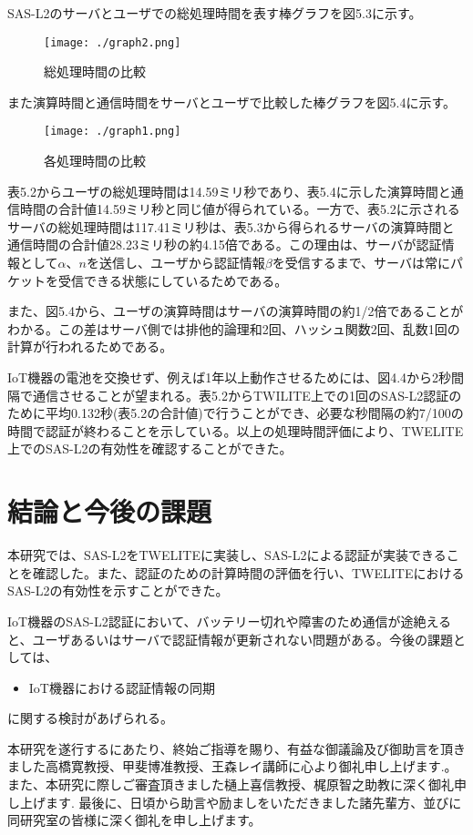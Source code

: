 \documentclass{thesis}
\begin{document}
SAS-L2のサーバとユーザでの総処理時間を表す棒グラフを図5.3に示す。

\begin{figure}[H]
 \center
 \texttt{[image: ./graph2.png]}
 \caption{総処理時間の比較}
\end{figure}

また演算時間と通信時間をサーバとユーザで比較した棒グラフを図5.4に示す。

\begin{figure}[H]
 \center
 \texttt{[image: ./graph1.png]}
 \caption{各処理時間の比較}
\end{figure}

表5.2からユーザの総処理時間は14.59ミリ秒であり、表5.4に示した演算時間と通信時間の合計値14.59ミリ秒と同じ値が得られている。一方で、表5.2に示されるサーバの総処理時間は117.41ミリ秒は、表5.3から得られるサーバの演算時間と通信時間の合計値28.23ミリ秒の約4.15倍である。この理由は、サーバが認証情報として$\alpha、n$を送信し、ユーザから認証情報$\beta$を受信するまで、サーバは常にパケットを受信できる状態にしているためである。

また、図5.4から、ユーザの演算時間はサーバの演算時間の約1/2倍であることがわかる。この差はサーバ側では排他的論理和2回、ハッシュ関数2回、乱数1回の計算が行われるためである。

IoT機器の電池を交換せず、例えば1年以上動作させるためには、図4.4から2秒間隔で通信させることが望まれる。表5.2からTWILITE上での1回のSAS-L2認証のために平均0.132秒(表5.2の合計値)で行うことができ、必要な秒間隔の約7/100の時間で認証が終わることを示している。以上の処理時間評価により、TWELITE上でのSAS-L2の有効性を確認することができた。

\chapter{結論と今後の課題}
\quad 本研究では、SAS-L2をTWELITEに実装し、SAS-L2による認証が実装できることを確認した。また、認証のための計算時間の評価を行い、TWELITEにおけるSAS-L2の有効性を示すことができた。

IoT機器のSAS-L2認証において、バッテリー切れや障害のため通信が途絶えると、ユーザあるいはサーバで認証情報が更新されない問題がある。今後の課題としては、
\begin{itemize}
  \item IoT機器における認証情報の同期
\end{itemize}
に関する検討があげられる。

\acknowledgement

\quad 本研究を遂行するにあたり、終始ご指導を賜り、有益な御議論及び御助言を頂きました高橋寛教授、甲斐博准教授、王森レイ講師に心より御礼申し上げます.。また、本研究に際しご審査頂きました樋上喜信教授、梶原智之助教に深く御礼申し上げます. 最後に、日頃から助言や励ましをいただきました諸先輩方、並びに同研究室の皆様に深く御礼を申し上げます。
\end{document}
